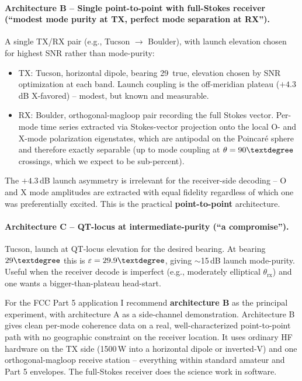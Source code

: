 \documentclass[11pt]{article}
\begin{document}
\paragraph{Architecture B -- Single point-to-point with full-Stokes
receiver (``modest mode purity at TX, perfect mode separation at
RX'').}  A single TX/RX pair (e.g., Tucson $\to$ Boulder), with
launch elevation chosen for highest SNR rather than mode-purity:
\begin{itemize}
\item TX: Tucson, horizontal dipole, bearing 29\textdegree\ true,
elevation chosen by SNR optimization at each band.  Launch coupling
is the off-meridian plateau ($+4.3$\,dB X-favored) -- modest, but
known and measurable.
\item RX: Boulder, orthogonal-magloop pair recording the full
Stokes vector.  Per-mode time series extracted via Stokes-vector
projection onto the local O- and X-mode polarization eigenstates,
which are antipodal on the Poincar\'e sphere and therefore exactly
separable (up to mode coupling at $\theta=90\textdegree$ crossings,
which we expect to be sub-percent).
\end{itemize}
The $+4.3$\,dB launch asymmetry is irrelevant for the receiver-side
decoding -- O and X mode amplitudes are extracted with equal
fidelity regardless of which one was preferentially excited.  This
is the practical \textbf{point-to-point} architecture.

\paragraph{Architecture C -- QT-locus at intermediate-purity (``a
compromise'').}  Tucson, launch at QT-locus elevation for the
desired bearing.  At bearing $29\textdegree$ this is
$\varepsilon=29.9\textdegree$, giving $\sim$15\,dB launch
mode-purity.  Useful when the receiver decode is imperfect (e.g.,
moderately elliptical $\theta_\text{rx}$) and one wants a
bigger-than-plateau head-start.

For the FCC Part 5 application I recommend \textbf{architecture B}
as the principal experiment, with architecture A as a side-channel
demonstration.  Architecture B gives clean per-mode coherence data
on a real, well-characterized point-to-point path with no
geographic constraint on the receiver location.  It uses ordinary
HF hardware on the TX side (1500\,W into a horizontal dipole or
inverted-V) and one orthogonal-magloop receive station -- everything
within standard amateur and Part 5 envelopes.  The full-Stokes
receiver does the science work in software.
\end{document}
